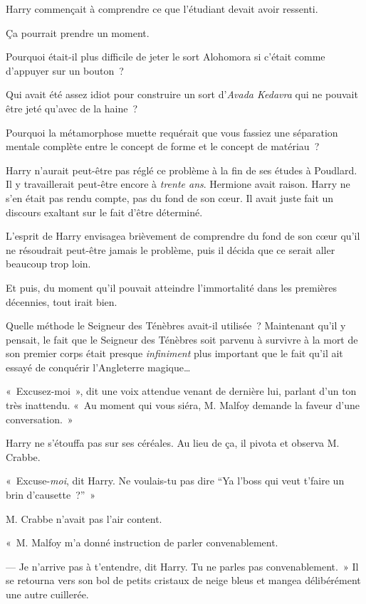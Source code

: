 Harry commençait à comprendre ce que l'étudiant devait avoir ressenti.

Ça pourrait prendre un moment.

Pourquoi était-il plus difficile de jeter le sort Alohomora si c'était comme d'appuyer sur un bouton~?

Qui avait été assez idiot pour construire un sort d'\emph{Avada Kedavra} qui ne pouvait être jeté qu'avec de la haine~?

Pourquoi la métamorphose muette requérait que vous fassiez une séparation mentale complète entre le concept de forme et le concept de matériau~?

Harry n'aurait peut-être pas réglé ce problème à la fin de ses études à Poudlard. Il y travaillerait peut-être encore à \emph{trente ans}. Hermione avait raison. Harry ne s'en était pas rendu compte, pas du fond de son cœur. Il avait juste fait un discours exaltant sur le fait d'être déterminé.

L'esprit de Harry envisagea brièvement de comprendre du fond de son cœur qu'il ne résoudrait peut-être jamais le problème, puis il décida que ce serait aller beaucoup trop loin.

Et puis, du moment qu'il pouvait atteindre l'immortalité dans les premières décennies, tout irait bien.

Quelle méthode le Seigneur des Ténèbres avait-il utilisée~? Maintenant qu'il y pensait, le fait que le Seigneur des Ténèbres soit parvenu à survivre à la mort de son premier corps était presque \emph{infiniment} plus important que le fait qu'il ait essayé de conquérir l'Angleterre magique…

«~Excusez-moi~», dit une voix attendue venant de dernière lui, parlant d'un ton très inattendu. «~Au moment qui vous siéra, M. Malfoy demande la faveur d'une conversation.~»

Harry ne s'étouffa pas sur ses céréales. Au lieu de ça, il pivota et observa M. Crabbe.

«~Excuse-\emph{moi}, dit Harry. Ne voulais-tu pas dire “Ya l'boss qui veut t'faire un brin d'causette~?”~»

M. Crabbe n'avait pas l'air content.

«~M. Malfoy m'a donné instruction de parler convenablement.

--- Je n'arrive pas à t'entendre, dit Harry. Tu ne parles pas convenablement.~» Il se retourna vers son bol de petits cristaux de neige bleus et mangea délibérément une autre cuillerée.


